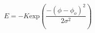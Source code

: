 \documentclass[12pt]{article}
\begin{document}
$$
E=-K\mathrm{exp}\left(\frac{-(\phi-\phi_{o})^2}{2\sigma^2}\right)
$$
\end{document}
